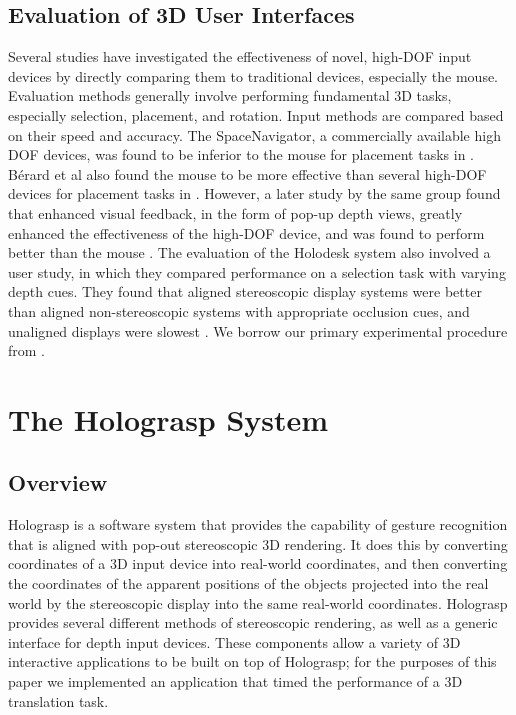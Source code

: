 \documentclass[pageno]{jpaper}
\begin{document}
\subsection{Evaluation of 3D User Interfaces}
Several studies have investigated the effectiveness of novel, high-DOF input devices by directly comparing them to traditional devices, especially the mouse.
Evaluation methods generally involve performing fundamental 3D tasks, especially selection, placement, and rotation. Input methods are compared based on their
speed and accuracy. The SpaceNavigator, a commercially available high DOF devices, was found to be inferior to the mouse for placement tasks in
\cite{mattheiss2011navigating}. B{\'e}rard et al also found the mouse to be more effective than several high-DOF devices for placement tasks
in \cite{study1}.  However, a later study by the same group found that enhanced visual feedback, in the form of pop-up depth views, greatly enhanced the effectiveness
of the high-DOF device, and was found to perform better than the mouse \cite{study2}. The
evaluation of the Holodesk system also involved a user study, in which they compared performance on a selection task with varying depth cues. They found that aligned
stereoscopic display systems were better than aligned non-stereoscopic systems with appropriate occlusion cues, and unaligned displays were slowest \cite{holodesk}.
We borrow our primary experimental procedure from \cite{study1, study2}.
\section{The Holograsp System}
\subsection{Overview}
Holograsp is a software system that provides the capability of gesture recognition that is aligned with pop-out stereoscopic 3D rendering. 
It does this by converting coordinates of a 3D input device into real-world coordinates, and then converting the coordinates of the
apparent positions of the objects projected into the real world by the stereoscopic display into the same real-world coordinates. 
Holograsp provides several different methods of stereoscopic rendering, as well as
a generic interface for depth input devices. These components allow a variety of 3D interactive applications to be built on top of Holograsp;
for the purposes of this paper we implemented an application that timed the performance of a 3D translation task.
\end{document}
